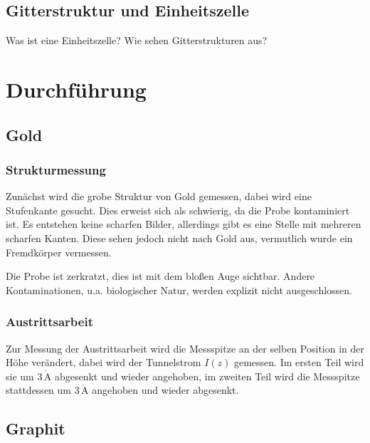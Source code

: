 \documentclass[12pt,a4paper]{scrartcl}
\numberwithin{equation}{section} %
\begin{document}
\hypertarget{gitterstruktur-und-einheitszelle}{%
\subsection{Gitterstruktur und
Einheitszelle}\label{gitterstruktur-und-einheitszelle}}

Was ist eine Einheitszelle? Wie sehen Gitterstrukturen aus?

\hypertarget{durchfuxfchrung}{%
\section{Durchführung}\label{durchfuxfchrung}}

\hypertarget{gold}{%
\subsection{Gold}\label{gold}}

\hypertarget{strukturmessung}{%
\subsubsection{Strukturmessung}\label{strukturmessung}}

Zunächst wird die grobe Struktur von Gold gemessen, dabei wird eine
Stufenkante gesucht. Dies erweist sich als schwierig, da die Probe
kontaminiert ist. Es entstehen keine scharfen Bilder, allerdings gibt es
eine Stelle mit mehreren scharfen Kanten. Diese sehen jedoch nicht nach
Gold aus, vermutlich wurde ein Fremdkörper vermessen.

Die Probe ist zerkratzt, dies ist mit dem bloßen Auge sichtbar. Andere
Kontaminationen, u.a. biologischer Natur, werden explizit nicht
ausgeschlossen.

\hypertarget{austrittsarbeit}{%
\subsubsection{Austrittsarbeit}\label{austrittsarbeit}}

Zur Messung der Austrittsarbeit wird die Messspitze an der selben
Position in der Höhe verändert, dabei wird der Tunnelstrom $I(z)$
gemessen. Im ersten Teil wird sie um $3\,\mathrm{\mathring{A}}$
abgesenkt und wieder angehoben, im zweiten Teil wird die Messspitze
stattdessen um $3\,\mathrm{\mathring{A}}$ angehoben und wieder
abgesenkt.

\hypertarget{graphit}{%
\subsection{Graphit}\label{graphit}}
\end{document}
